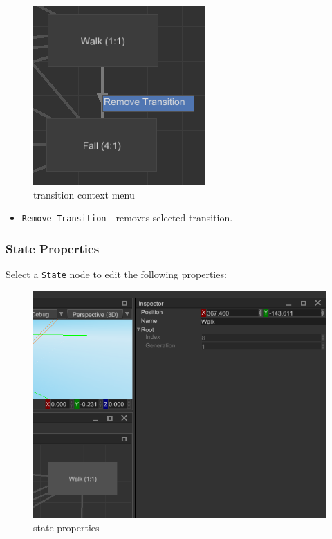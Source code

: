 \documentclass[
]{book}
\providecommand{\tightlist}{%
  \setlength{\itemsep}{0pt}\setlength{\parskip}{0pt}}
\theoremstyle{definition}
\theoremstyle{definition}
\theoremstyle{definition}
\theoremstyle{definition}
\theoremstyle{remark}
\begin{document}
\begin{figure}
\centering
\includegraphics{images/animation/absm_transition_context_menu.png}
\caption{transition context menu}
\end{figure}

\begin{itemize}
\tightlist
\item
  \texttt{Remove\ Transition} - removes selected transition.
\end{itemize}

\subsubsection{State Properties}\label{state-properties}

Select a \texttt{State} node to edit the following properties:

\begin{figure}
\centering
\includegraphics{images/animation/absm_state_properties.png}
\caption{state properties}
\end{figure}
\end{document}
